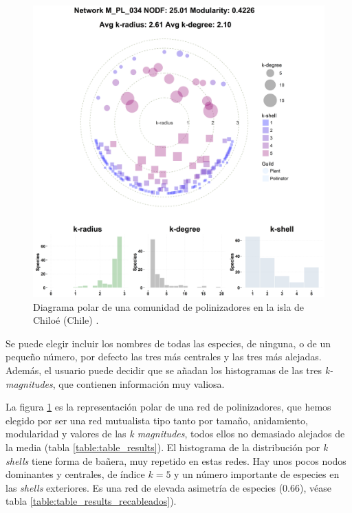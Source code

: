 \begin{figure}[h!]
\centering
\includegraphics[scale=0.4]{Figures/VIS_M_PL_034_polar.png}
\caption[PolarExample]{Diagrama polar de una comunidad de polinizadores en la isla de Chiloé (Chile) \cite{smith2005diversity}.}
\label{fig:VIS_M_PL_034_polar}
\end{figure}

Se puede elegir incluir los nombres de todas las especies, de ninguna, o de un pequeño número, por defecto las tres más centrales y las tres más alejadas. Además, el usuario puede decidir que se añadan los histogramas de las tres \textit{k-magnitudes}, que contienen información muy valiosa.

La figura \ref{fig:VIS_M_PL_034_polar} es la representación polar de una red de polinizadores, que hemos elegido por ser una red mutualista tipo tanto por tamaño, anidamiento, modularidad y valores de las \textit{k magnitudes}, todos ellos no demasiado alejados de la media (tabla \ref{table:table_results}). El histograma de la distribución por \textit{k shells} tiene forma de bañera, muy repetido en estas redes. Hay unos pocos nodos dominantes y centrales, de índice $k = 5$ y un número importante de especies en las \textit{shells} exteriores. Es una red de elevada asimetría de especies ($0.66$), véase tabla \ref{table:table_results_recableados}).

